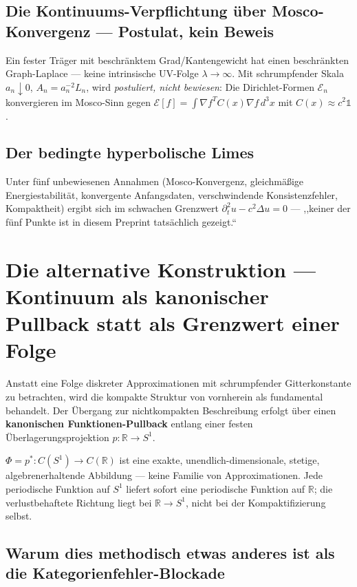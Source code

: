 \subsection{Die Kontinuums-Verpflichtung über Mosco-Konvergenz — Postulat, kein Beweis}

Ein fester Träger mit beschränktem Grad/Kantengewicht hat einen
beschränkten Graph-Laplace — keine intrinsische UV-Folge $\lambda\to\infty$.
Mit schrumpfender Skala $a_n\downarrow0$, $A_n=a_n^{-2}L_n$, wird
\emph{postuliert, nicht bewiesen}: Die Dirichlet-Formen $\mathcal E_n$
konvergieren im Mosco-Sinn gegen
$\mathcal E[f]=\int\nabla f^{T}C(x)\nabla f\,d^3x$ mit $C(x)\approx c^2\mathbb1$.

\subsection{Der bedingte hyperbolische Limes}

Unter fünf unbewiesenen Annahmen (Mosco-Konvergenz, gleichmäßige
Energiestabilität, konvergente Anfangsdaten, verschwindende
Konsistenzfehler, Kompaktheit) ergibt sich im schwachen Grenzwert
$\partial_t^2u-c^2\Delta u=0$ — ,,keiner der fünf Punkte ist in diesem
Preprint tatsächlich gezeigt.``

\section{Die alternative Konstruktion — Kontinuum als kanonischer Pullback statt als Grenzwert einer Folge}

Anstatt eine Folge diskreter Approximationen mit schrumpfender
Gitterkonstante zu betrachten, wird die kompakte Struktur von vornherein
als fundamental behandelt. Der Übergang zur nichtkompakten Beschreibung
erfolgt über einen \textbf{kanonischen Funktionen-Pullback} entlang einer
festen Überlagerungsprojektion $p:\mathbb{R}\to S^1$.

\begin{quellbox}[title={Der Pullback als exakte Abbildung}]
$\Phi=p^{*}:C(S^1)\to C(\mathbb{R})$ ist eine exakte,
unendlich-dimensionale, stetige, algebrenerhaltende Abbildung — keine
Familie von Approximationen. Jede periodische Funktion auf $S^1$ liefert
sofort eine periodische Funktion auf $\mathbb{R}$; die verlustbehaftete
Richtung liegt bei $\mathbb{R}\to S^1$, nicht bei der Kompaktifizierung
selbst.
\end{quellbox}

\subsection{Warum dies methodisch etwas anderes ist als die Kategorienfehler-Blockade}

